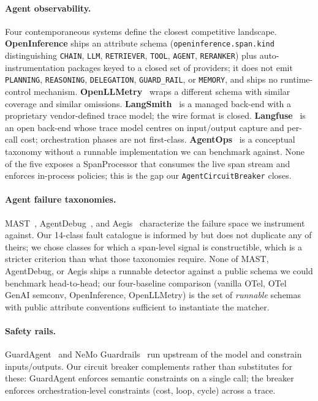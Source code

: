 \documentclass[sigplan,10pt,anonymous,review]{acmart}
\begin{document}
\paragraph{Agent observability.} Four contemporaneous systems define
the closest competitive landscape. \textbf{OpenInference}
\cite{openinference} ships an attribute schema (\texttt{openinference.span.kind}
distinguishing \texttt{CHAIN}, \texttt{LLM}, \texttt{RETRIEVER},
\texttt{TOOL}, \texttt{AGENT}, \texttt{RERANKER}) plus auto-instrumentation packages
keyed to a closed set of providers; it does not emit
\texttt{PLANNING}, \texttt{REASONING}, \texttt{DELEGATION},
\texttt{GUARD\_RAIL}, or \texttt{MEMORY}, and ships no runtime-control
mechanism. \textbf{OpenLLMetry}~\cite{openllmetry} wraps a different
schema with similar coverage and similar omissions.
\textbf{LangSmith}~\cite{langsmith} is a managed back-end with a
proprietary vendor-defined trace model; the wire format is closed.
\textbf{Langfuse}~\cite{langfuse} is an open back-end whose trace
model centres on input/output capture and per-call cost; orchestration
phases are not first-class. \textbf{AgentOps}~\cite{agentops} is a
conceptual taxonomy without a runnable implementation we can benchmark
against. None of the five exposes a SpanProcessor that consumes the
live span stream and enforces in-process policies; this is the gap our
\texttt{AgentCircuitBreaker} closes.

\paragraph{Agent failure taxonomies.}
MAST~\cite{mast}, AgentDebug~\cite{agentdebug}, and
Aegis~\cite{aegis} characterize the failure space we instrument
against. Our 14-class fault catalogue is informed by but does not
duplicate any of theirs; we chose classes for which a span-level
signal is constructible, which is a stricter criterion than what those
taxonomies require. None of MAST, AgentDebug, or Aegis ships a
runnable detector against a public schema we could benchmark
head-to-head; our four-baseline comparison (vanilla OTel, OTel GenAI
semconv, OpenInference, OpenLLMetry) is the set of \emph{runnable}
schemas with public attribute conventions sufficient to instantiate the
matcher.

\paragraph{Safety rails.} GuardAgent~\cite{guardagent} and NeMo
Guardrails~\cite{nemo_guardrails} run upstream of the model and
constrain inputs/outputs. Our circuit breaker complements rather than
substitutes for these: GuardAgent enforces semantic constraints on a
single call; the breaker enforces orchestration-level constraints
(cost, loop, cycle) across a trace.
\end{document}

